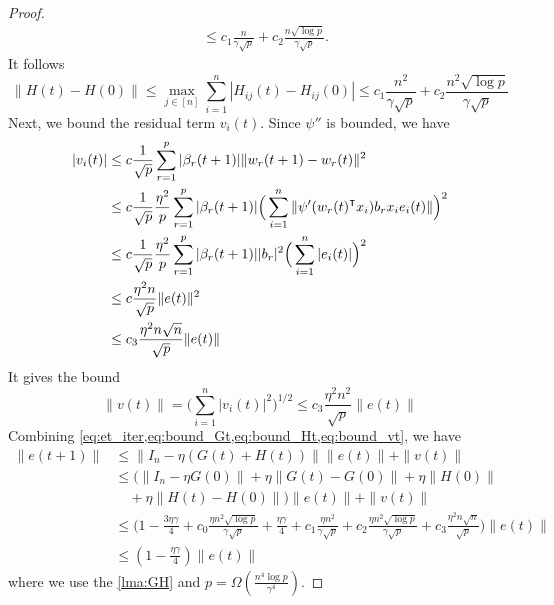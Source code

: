 \begin{proof}
\begin{equation*}
\begin{aligned}
    &\leq c_1 \frac{n}{\gamma\sqrt p} + c_2\frac{n\sqrt{\log p}}{\gamma\sqrt p}.
\end{aligned}
\end{equation*}
It follows
\begin{equation}\label{eq:bound_Ht}
    \|H(t)-H(0)\| \leq \max_{j \in [n]}\sum_{i=1}^n|H_{ij}(t) - H_{ij}(0)| \leq c_1 \frac{n^2}{\gamma\sqrt p} + c_2\frac{n^2\sqrt{\log p}}{\gamma\sqrt p}
\end{equation}
Next, we bound the residual term $v_i(t)$. Since $\psi''$ is bounded, we have
\begin{equation*}
\begin{aligned}
    |v_i(t)|
    &\leq c\frac{1}{\sqrt p}\sum_{r=1}^p|\beta_r(t+1)|\|w_r(t+1)-w_r(t)\|^2 \\
    &\leq c\frac{1}{\sqrt p}\frac{\eta^2}{p}\sum_{r=1}^p|\beta_r(t+1)|\Big(\sum_{i=1}^n\|\psi'(w_r(t)\transpose x_i)b_rx_ie_i(t)\|\Big)^2 \\
    &\leq c\frac{1}{\sqrt p}\frac{\eta^2}{p}\sum_{r=1}^p|\beta_r(t+1)||b_r|^2\Big(\sum_{i=1}^n|e_i(t)|\Big)^2 \\
    &\leq c\frac{\eta^2n}{\sqrt p}\|e(t)\|^2 \\
    &\leq c_3\frac{\eta^2n\sqrt n}{\sqrt p}\|e(t)\|
\end{aligned}
\end{equation*}
It gives the bound
\begin{equation}\label{eq:bound_vt}
    \|v(t)\| =\Big(\sum_{i=1}^n|v_i(t)|^2\Big)^{1/2} \leq c_3\frac{\eta^2n^2}{\sqrt p}\|e(t)\|
\end{equation}
Combining \cref{eq:et_iter,eq:bound_Gt,eq:bound_Ht,eq:bound_vt}, we have
\begin{equation*}
\begin{aligned}
\|e(t+1)\| 
&\leq \|I_n-\eta (G(t)+H(t))\|\|e(t)\|+\|v(t)\| \\
&\leq \Big(\|I_n-\eta G(0)\|+\eta\|G(t)-G(0)\|+\eta\|H(0)\| \\
&\quad +\eta\|H(t)-H(0)\|\Big)\|e(t)\| + \|v(t)\| \\
&\leq \Big( 1-\frac{3\eta\gamma}{4}+c_0\frac{\eta n^2\sqrt{\log p}}{\gamma\sqrt p}+\frac{\eta\gamma}{4}+c_1\frac{\eta n^2}{\gamma\sqrt p} + c_2\frac{\eta n^2\sqrt{\log p}}{\gamma\sqrt p}+c_3\frac{\eta^2n\sqrt n}{\sqrt p}\Big)\|e(t)\|  \\
&\leq(1-\frac{\eta\gamma}{4})\|e(t)\|
\end{aligned}
\end{equation*}
where we use the \cref{lma:GH} and $p=\Omega(\frac{n^4\log p}{\gamma^4})$.
\end{proof}

